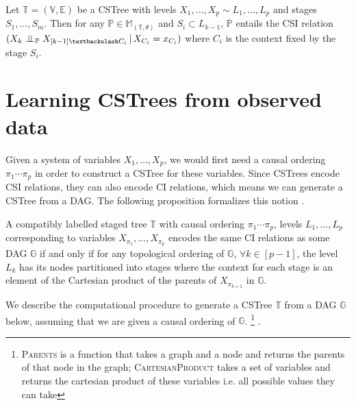\documentclass{tufte-book}
\begin{document}
\begin{lemma}\label{lem:cstreecsi}

Let $\mathbb{T} = (\mathbb{V},\mathbb{E})$ be a CSTree with levels $X_1,...,X_p \sim L_1,...,L_p$ and stages $S_1,...,S_m$. Then for any $\mathbb{P} \in \mathbb{M}_{(\mathbb{T},\theta)}$ and $S_i \subset L_{k-1}$, $\mathbb{P}$ entails the CSI relation $(X_k \indep_{\mathbb{P}} X_{[k-1] \textbackslash C_i} \, | \, X_{C_i} = x_{C_i})$ where $C_i$ is the context fixed by the stage $S_i$.

\end{lemma}




\section{Learning CSTrees from observed data}
\label{sec:orgeaf94c0}
Given a system of variables \(X_1,...,X_p\), we would first need a causal ordering \(\pi_1 \cdots \pi_p\) in order to construct a CSTree for these variables. Since CSTrees encode CSI relations, they can also encode CI relations, which means we can generate a CSTree from a DAG. The following proposition formalizes this notion \cite{duarte-2020-algeb}.

\begin{proposition}\label{prop:dagandcstree}
A compatibly labelled staged tree $\mathbb{T}$ with causal ordering $\pi_1 \cdots\pi_p$, levels $L_1,...,L_p$ corresponding to variables $X_{\pi_1},...,X_{\pi_p}$ encodes the same CI relations as some DAG $\mathbb{G}$ if and only if for any topological ordering of $\mathbb{G}$, $\forall k \in [p-1]$, the level $L_k$ has its nodes partitioned into stages where the context for each stage is an element of the Cartesian product of the parents of $X_{\pi_{k+1}}$ in $\mathbb{G}$.
\end{proposition}

We describe the computational procedure to generate a CSTree \(\mathbb{T}\) from a DAG \(\mathbb{G}\) below, assuming that we are given a causal ordering of \(\mathbb{G}\).  \footnote{\textsc{Parents} is a function that takes a graph and a node and returns the parents of that node in the graph; \textsc{CartesianProduct} takes a set of variables and returns the cartesian product of these variables i.e. all possible values they can take} .
\end{document}
